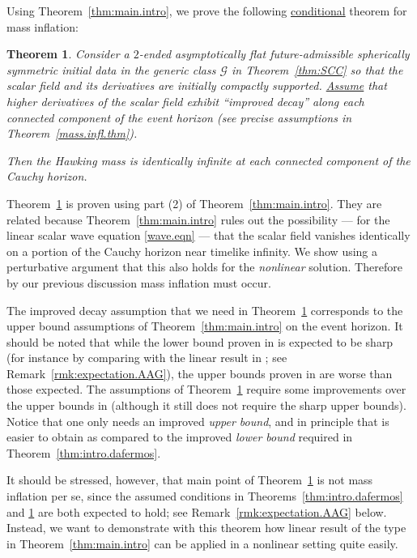 \documentclass[10pt, reqno]{amsart}
\newtheorem{theorem}{Theorem}[section]
\theoremstyle{definition}
\theoremstyle{remark}
\numberwithin{equation}{section}
\newcommand{\0}{\emptyset}
\begin{document}
Using Theorem~\ref{thm:main.intro}, we prove the following \underline{conditional} theorem for mass inflation:

\begin{theorem}\label{thm:intro.MI.2}
Consider a $2$-ended asymptotically flat future-admissible spherically symmetric initial data in the generic class $\mathcal G$ in Theorem~\ref{thm:SCC} so that the scalar field and its derivatives are initially compactly supported. \underline{Assume} that higher derivatives of the scalar field exhibit ``improved decay'' along each connected component of the event horizon (see precise assumptions in Theorem~\ref{mass.infl.thm}).

Then the Hawking mass is identically infinite at each connected component of the Cauchy horizon.
\end{theorem}

Theorem~\ref{thm:intro.MI.2} is proven using part (2) of Theorem~\ref{thm:main.intro}. They are related because Theorem~\ref{thm:main.intro} rules out the possibility --- for the linear scalar wave equation \eqref{wave.eqn} --- that the scalar field vanishes identically on a portion of the Cauchy horizon near timelike infinity. We show using a perturbative argument that this also holds for the \emph{nonlinear} solution. Therefore by our previous discussion mass inflation must occur.

The improved decay assumption that we need in Theorem~\ref{thm:intro.MI.2} corresponds to the upper bound assumptions of Theorem~\ref{thm:main.intro} on the event horizon. It should be noted that while the lower bound proven in \cite{LO.interior} is expected to be sharp (for instance by comparing with the linear result in \cite{AAG}; see Remark~\ref{rmk:expectation.AAG}), the upper bounds proven in \cite{DRPL} are worse than those expected. The assumptions of Theorem~\ref{thm:intro.MI.2} require some improvements over the upper bounds in \cite{DRPL} (although it still does not require the sharp upper bounds). Notice that one only needs an improved \emph{upper bound}, and in principle that is easier to obtain as compared to the improved \emph{lower bound} required in Theorem~\ref{thm:intro.dafermos}.

It should be stressed, however, that main point of Theorem~\ref{thm:intro.MI.2} is not mass inflation per se, since the assumed conditions in Theorems~\ref{thm:intro.dafermos} and \ref{thm:intro.MI.2} are both expected to hold; see Remark~\ref{rmk:expectation.AAG} below. Instead, we want to demonstrate with this theorem how linear result of the type in Theorem~\ref{thm:main.intro} can be applied in a nonlinear setting quite easily.
\end{document}
